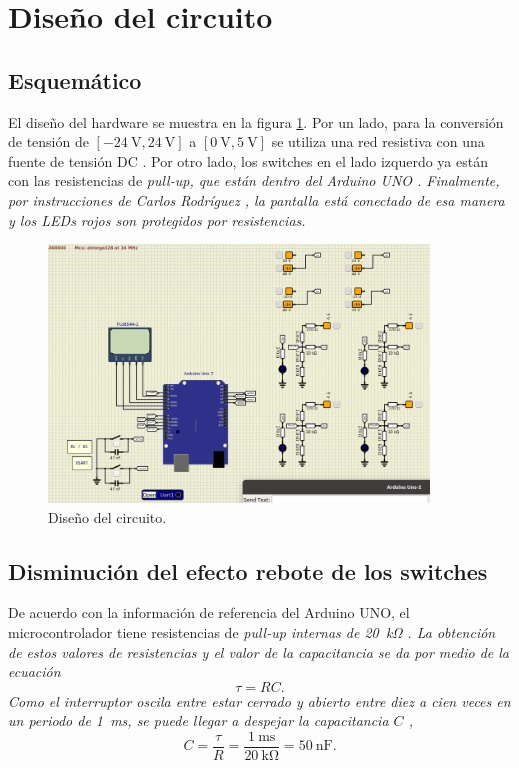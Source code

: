 \section{Diseño del circuito} 
\subsection{Esquemático}
El diseño del hardware se muestra en la figura \ref{Fig: Diseño}. Por un lado, para la conversión de tensión de $[\SI{-24}{\volt}, \SI{24}{\volt}]$ a $[\SI{0}{\volt}, \SI{5}{\volt}]$ se utiliza una red resistiva con una fuente de tensión DC \cite{electronics-stackexchange}. Por otro lado, los switches en el lado izquerdo ya están con las resistencias de \it{pull-up}, que están dentro del Arduino UNO \cite{pullup}. Finalmente, por instrucciones de Carlos Rodríguez \cite{pcd}, la pantalla está conectado de esa manera y los LEDs rojos son protegidos por resistencias. 
\begin{figure}[H]
\centering
\includegraphics[width=0.9\textwidth]{Imagenes/Diseno_circuito.png} 
\caption{Diseño del circuito.}
\label{Fig: Diseño}
\end{figure}

\subsection{Disminución del efecto rebote de los switches}
De acuerdo con la información de referencia del Arduino UNO, el microcontrolador tiene resistencias de \it{pull-up} internas de \SI{20}{\kilo\ohm} \cite{pullup}.
La obtención de estos valores de resistencias y el valor de la capacitancia se da por medio de la ecuación
\begin{equation}
    \tau = RC.
\end{equation}
Como el interruptor oscila entre estar cerrado y abierto entre diez a cien veces en un periodo de \SI{1}{\milli\second}, se puede llegar a despejar la capacitancia $C$
\cite{boton},
\begin{equation*}
    C = \frac{\tau}{R} = \frac{\SI{1}{\milli\second}}{\SI{20}{\kilo\ohm}} = \SI{50}{\nano\farad}.
\end{equation*}

